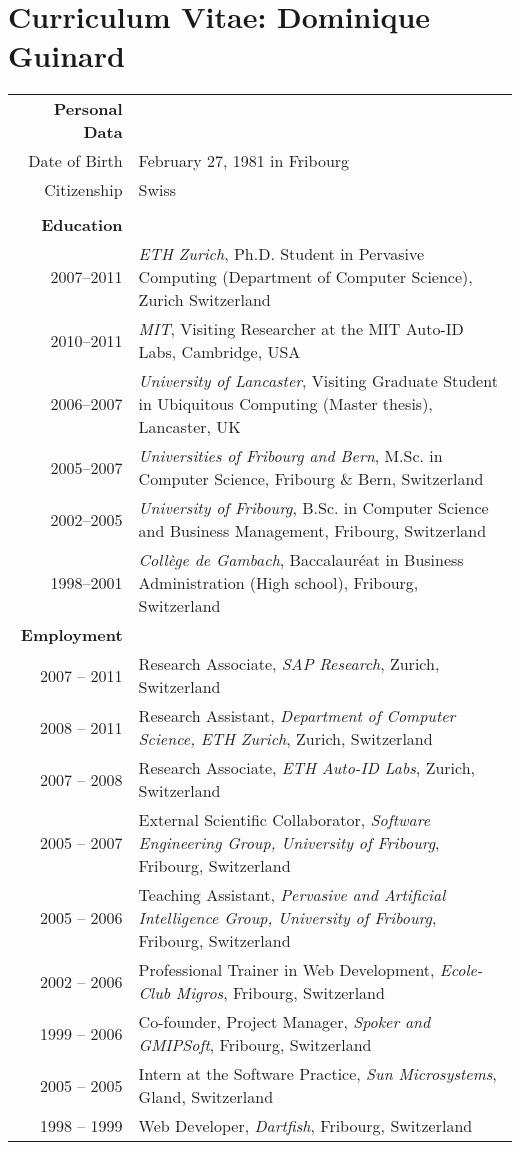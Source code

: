 \chapter*{Curriculum Vitae: Dominique Guinard}
\pagestyle{empty}
\thispagestyle{empty}
\vspace{-74pt}

\begin{supertabular}{rp{10cm}}
{\bf Personal Data} & \\
Date of Birth & February 27, 1981 in Fribourg \\
Citizenship & Swiss \\
\\
{\bf Education} & \\
2007--2011 & \emph{ETH Zurich}, Ph.D. Student in Pervasive Computing (Department of Computer Science), 
Zurich Switzerland\\
2010--2011 & \emph{MIT}, Visiting Researcher at the MIT Auto-ID Labs,
Cambridge, USA\\
2006--2007 & \emph{University of Lancaster}, Visiting Graduate Student in Ubiquitous Computing (Master thesis),
Lancaster, UK\\
2005--2007 & \emph{Universities of Fribourg and Bern}, M.Sc. in Computer Science, 
Fribourg \& Bern, Switzerland\\
2002--2005 & \emph{University of Fribourg}, B.Sc. in Computer Science and Business Management, 
Fribourg, Switzerland\\
1998--2001 & \emph{Coll\`{e}ge de Gambach}, Baccalaur\'{e}at in Business Administration
(High school), Fribourg, Switzerland\\ 


{\bf Employment} & \\
2007 -- 2011 & Research Associate, \emph{SAP Research}, Zurich, Switzerland\\
2008 -- 2011 & Research Assistant, \emph{Department of Computer Science, ETH Zurich}, Zurich, Switzerland\\
2007 -- 2008 & Research Associate, \emph{ETH Auto-ID Labs}, Zurich, Switzerland\\
2005 -- 2007 & External Scientific Collaborator, \emph{Software Engineering Group, University of Fribourg}, Fribourg, Switzerland\\ 
2005 -- 2006 & Teaching Assistant, \emph{Pervasive and Artificial Intelligence Group, University of Fribourg}, Fribourg, Switzerland\\
2002 -- 2006 & Professional Trainer in Web Development, \emph{Ecole-Club Migros}, Fribourg, Switzerland\\
1999 -- 2006 & Co-founder, Project Manager, \emph{Spoker and GMIPSoft}, Fribourg, Switzerland\\
2005 -- 2005 & Intern at the Software Practice, \emph{Sun Microsystems}, Gland, Switzerland\\
1998 -- 1999 & Web Developer, \emph{Dartfish}, Fribourg, Switzerland\\
\end{supertabular}